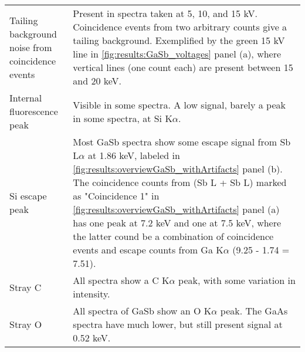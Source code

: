 \begin{table}[phtb]
\begin{center}
\begin{tabular}{p{3.5cm}p{11.1cm}}
			Tailing background noise from coincidence events & Present in spectra taken at 5, 10, and 15 kV. Coincidence events from two arbitrary counts give a tailing background. Exemplified by the green 15 kV line in \cref{fig:results:GaSb_voltages} panel (a), where vertical lines (one count each) are present between 15 and 20 keV.                                                                                                                                                               \\
			Internal fluorescence peak                       & Visible in some spectra. A low signal, barely a peak in some spectra, at Si K$\alpha$.                                                                                                                                                                                                                                                                                                                                                          \\
			Si escape peak                                   & Most GaSb spectra show some escape signal from Sb L$\alpha$ at 1.86 keV, labeled in \cref{fig:results:overviewGaSb_withArtifacts} panel (b). The coincidence counts from (Sb L + Sb L) marked as "Coincidence 1" in \cref{fig:results:overviewGaSb_withArtifacts} panel (a) has one peak at 7.2 keV and one at 7.5 keV, where the latter cound be a combination of coincidence events and escape counts from Ga K$\alpha$ (9.25 - 1.74 = 7.51). \\
			Stray C                                          & All spectra show a C K$\alpha$ peak, with some variation in intensity.                                                                                                                                                                                                                                                                                                                                                                          \\
			Stray O                                          & All spectra of GaSb show an O K$\alpha$ peak. The GaAs spectra have much lower, but still present signal at 0.52 keV.                                                                                                                                                                                                                                                                                                                           \\
			\hline
		\end{tabular}
	\end{center}
\end{table}
